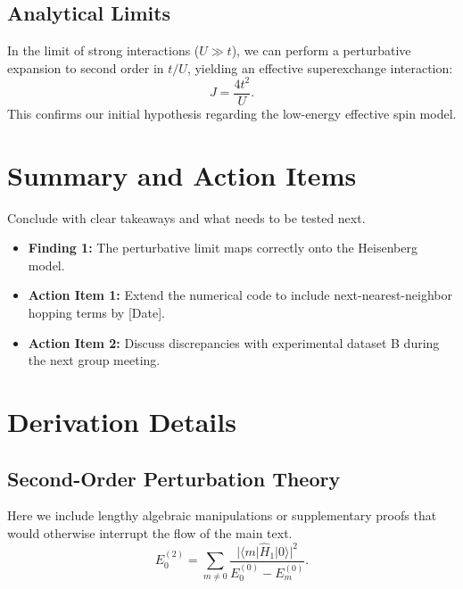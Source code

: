 \documentclass[
    reprint,
    aps,
    pra,
    amsmath,
    amssymb,
    superscriptaddress,
    onecolumn,
    11pt
]{revtex4-2}
\begin{document}
\subsection{Analytical Limits}
In the limit of strong interactions ($U \gg t$), we can perform a perturbative expansion to second order in $t/U$, yielding an effective superexchange interaction:
\begin{equation}
    J = \frac{4t^2}{U}.
\end{equation}
This confirms our initial hypothesis regarding the low-energy effective spin model.

\section{\label{sec:conclusion}Summary and Action Items}
Conclude with clear takeaways and what needs to be tested next.
\begin{itemize}
    \item \textbf{Finding 1:} The perturbative limit maps correctly onto the Heisenberg model.
    \item \textbf{Action Item 1:} Extend the numerical code to include next-nearest-neighbor hopping terms by [Date].
    \item \textbf{Action Item 2:} Discuss discrepancies with experimental dataset B during the next group meeting.
\end{itemize}

\newpage
\appendix

\section{Derivation Details}
\subsection{Second-Order Perturbation Theory}
Here we include lengthy algebraic manipulations or supplementary proofs that would otherwise interrupt the flow of the main text.
\begin{equation}
    E_0^{(2)} = \sum_{m \neq 0} \frac{|\langle m | \hat{H}_1 | 0 \rangle|^2}{E_0^{(0)} - E_m^{(0)}}.
\end{equation}

\newpage

\end{document}

